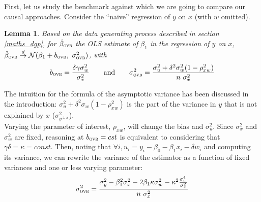 \documentclass[usletter, 12pt]{article}
\newtheorem{lemma}{Lemma}
\begin{document}
				First, let us study the benchmark against which we are going to compare our causal approaches. Consider the ``naive'' regression of $y$ on $x$ (with $w$ omitted). 
%				
						
				\begin{lemma}\label{lemma_ovb}
					Based on the data generating process described in section \ref{maths_dgp}, for $\hat{\beta}_{\textsc{ovb}}$ the OLS estimate of $\beta_{1}$ in the regression of $y$ on $x$, $\hat{\beta}_{\textsc{ovb}} \overset{d}{\to} \mathcal{N}(\beta_{1} + b_{\textsc{ovb}} , \ \sigma_{\textsc{ovb}}^{2})$, with
					\[
						b_{\textsc{ovb}} = \dfrac{\delta \gamma \sigma_{w}^{2}}{\sigma_{x}^{2}} 
						\qquad \text{and} \qquad
						\sigma_{\textsc{ovb}}^{2} = \dfrac{\sigma_{u}^{2} + \delta^{2} \sigma_{w}^{2}(1 - \rho_{xw}^{2})}{n \ \sigma_{x}^{2}}
					\]
				\end{lemma}
				
			The intuition for the formula of the asymptotic variance has been discussed in the introduction: $\sigma_{u}^{2} + \delta^{2} \sigma_{w}(1 - \rho_{xw}^{2})$ is the part of the variance in $y$ that is not explained by $x$ ($\sigma^{2}_{y^{\perp x}}$).\\
			
			Varying the parameter of interest, $\rho_{xw}$, will change the bias and $\sigma_{u}^{2}$. Since $\sigma_{x}^{2}$ and $\sigma_{w}^{2}$ are fixed, reasoning at $b_{\textsc{ovb}} = cst$ is equivalent to considering that $\gamma \delta = \kappa = const$. Then, noting that $\forall i, u_{i} = y_i - \beta_{0} - \beta_{1}x_{i} - \delta w_{i}$ and computing its variance, we can rewrite the variance of the estimator as a function of fixed variances and one or less varying parameter:
			~
			\[
				\sigma_{\textsc{ovb}}^{2} = \dfrac{\sigma_{y}^{2} - \beta_{1}^{2}\sigma_{x}^{2} - 2\beta_{1}\kappa\sigma_{w}^{2} - \kappa^{2}\frac{\sigma_{w}^{4}}{\sigma_{x}^{2}}}{n \ \sigma_{x}^{2}}
			\]
			
\end{document}
